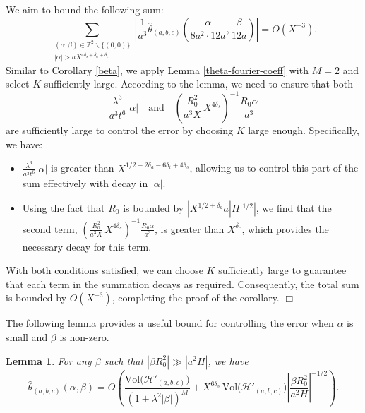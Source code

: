 \documentclass{article}
\def\H{{\mathcal H}}
\def\H{{\mathcal H}}
\newtheorem{lemma}[theorem]{Lemma}
\newenvironment{proof}{\noindent {\bf Proof:}}{$\Box$ \vspace{2 ex}}
\begin{document}
\begin{proof}
 We aim to bound the following sum:
\begin{equation*}
    \sum_{\substack{(\alpha, \beta) \in \mathbb{Z}^2 \backslash \{(0, 0)\} \\ |\alpha| > a X^{4\delta_s + \delta_a + \delta_e}}} 
    \left| \frac{1}{a^3} \widehat{\theta}_{(a, b, c)}\left(\frac{\alpha}{8a^2 \cdot 12a}, \frac{\beta}{12a}\right) \right| = O(X^{-3}).
\end{equation*}
Similar to Corollary \ref{beta}, we apply Lemma \ref{theta-fourier-coeff} with $M = 2$ and select $K$ sufficiently large. According to the lemma, we need to ensure that both
\begin{equation*}
    \frac{\lambda^3}{a^3 t^6} |\alpha| \quad \text{and} \quad \left( \frac{R_0^2}{a^3 X} \, X^{4\delta_s} \right)^{-1} \frac{R_0 \alpha}{a^3}
\end{equation*}
are sufficiently large to control the error by choosing $K$ large enough. Specifically, we have:

\begin{itemize}
    \item $\frac{\lambda^3}{a^3 t^6} |\alpha|$ is greater than $X^{1/2 - 2\delta_a - 6\delta_t + 4\delta_s}$, allowing us to control this part of the sum effectively with decay in $|\alpha|$.

    \item Using the fact that $R_0$ is bounded by $|X^{1/2 + \delta_a} a |H|^{1/2}|$, we find that the second term, $\left( \frac{R_0^2}{a^3 X} \, X^{4\delta_s} \right)^{-1} \frac{R_0 \alpha}{a^3}$, is greater than $X^{\delta_e}$, which provides the necessary decay for this term.
\end{itemize}
With both conditions satisfied, we can choose $K$ sufficiently large to guarantee that each term in the summation decays as required. Consequently, the total sum is bounded by $O(X^{-3})$, completing the proof of the corollary.   
\end{proof}

The following lemma provides a useful bound for controlling the error when $\alpha$ is small and
$\beta$ is non-zero.
\begin{lemma}\label{theta-fourier-coeff-zero} For any $\beta$ such that $|\beta R_0^2| \gg |a^2 H|$, we have \begin{equation*}
\widehat{\theta}_{(a, b, c)}(\alpha, \beta) = O\left(\frac{\mathrm{Vol}\big(\H'_{(a,b,c)}\big)}{(1 + \lambda^2 |\beta|)^M} + X^{6\delta_s} \, \mathrm{Vol}\big(\H'_{(a,b,c)}\big) \left|\frac{\beta R_0^2}{a^2 H}\right|^{-1/2}\right). \end{equation*} 
\end{lemma}
\end{document}
